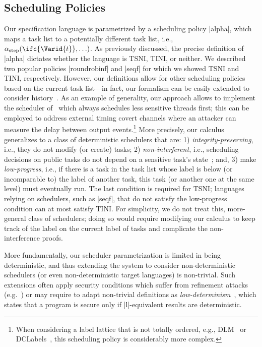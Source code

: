 \subsection{Scheduling Policies}
Our specification language is parametrized by a scheduling policy |alpha|, which
maps a task list to a potentially different task list, i.e.,
$\alpha_{{\tiny\mathrm{\text{step}}}}(\ifc{\Varid{t}},\ldots)$. 
%
As previously discussed, the precise definition of |alpha|
dictates whether the language is TSNI, TINI, or neither.
%
We described two popular policies |roundrobinf| and
|seqf| for which we showed TSNI and TINI, respectively.
%
However, our definitions allow for other scheduling policies based on the
current task list---in fact, our formalism can be easily 
extended to consider history~\cite{BartheRRS07}.
%
As an example of generality, our approach allows to implement the scheduler of~\cite{Kashyap:2011}
which always schedules less sensitive threads first; this can be
employed to address external timing covert channels where an attacker
can measure the delay between output events.\footnote{
  When considering a label lattice that is not totally ordered, e.g.,
  DLM~\cite{myers:dlm} or DCLabels~\cite{dclabels}, this scheduling policy is
  considerably more complex.
}
%
More precisely, our calculus generalizes to a class of deterministic
schedulers that are: 1) \emph{integrity-preserving}, i.e., they do not
modify (or create) tasks; 2) \emph{non-interferent}, i.e., 
scheduling decisions on public tasks do not depend on a sensitive task's
state~\cite{russo2006securing}; and, 3) make \emph{low-progress}, i.e., if there
is a task in the task list whose label is below (or incomparable to) the label
of another task, this task (or another one at the same level) must eventually
run.
%
The last condition is required for TSNI; languages relying on
schedulers, such as |seqf|, that do not satisfy the low-progress
condition can at most satisfy TINI.
%
For simplicity, we do not treat this, more-general class of schedulers;
doing so would require modifying our calculus to keep track of the
label on the current label of tasks and complicate the
non-interference proofs.

More fundamentally, our scheduler parametrization is limited in being
deterministic, and thus extending the system to consider non-deterministic
schedulers (or even non-deterministic target languages) is non-trivial.
%
%
%
Such extensions often apply security conditions which suffer 
from refinement attacks (e.g.~\cite{Smith:Volpano:MultiThreaded}) or may require to
adapt non-trivial definitions as
\emph{low-determinism}~\cite{Zdancewic:Myers:CSFW03,Huisman:Worah:Sunesen:CSFW06,Terauchi:2008},
which states that a program is secure only if |l|-equivalent results are
deterministic.

